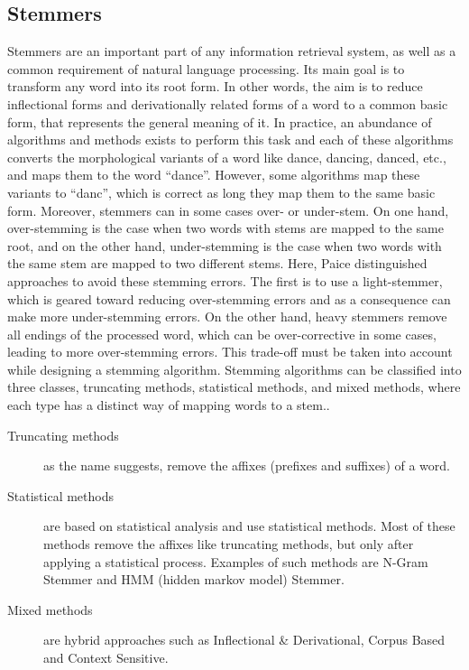		\subsection{Stemmers}\label{subsec:stemmer}
		Stemmers are an important part of any information retrieval system, as well as a common requirement of natural language processing. Its main goal is to transform any word into its root form. In other words, the aim is to reduce inflectional forms and derivationally related forms of a word to a common basic form, that represents the general meaning of it\cite{jivani2011comparative}.\newline
		In practice, an abundance of algorithms and methods exists to perform this task and each of these algorithms converts the morphological variants of a word like dance, dancing, danced, etc., and maps them to the word ``dance''. However, some algorithms map these variants to ``danc'', which is correct as long they map them to the same basic form.\cite{jivani2011comparative} Moreover, stemmers can in some cases over- or under-stem. On one hand, over-stemming is the case when two words with stems are mapped to the same root, and on the other hand, under-stemming is the case when two words with the same stem are mapped to two different stems. Here, Paice distinguished approaches to avoid these stemming errors. The first is to use a light-stemmer, which is geared toward reducing over-stemming errors and as a consequence can make more under-stemming errors. On the other hand, heavy stemmers remove all endings of the processed word, which can be over-corrective in some cases, leading to more over-stemming errors. This trade-off must be taken into account while designing a stemming algorithm.\cite{paice1994evaluation}\newline
		Stemming algorithms can be classified into three classes, truncating methods, statistical methods, and mixed methods, where each type has a distinct way of mapping words to a stem.\cite{jivani2011comparative}.
		\begin{description}
			\item[Truncating methods] as the name suggests, remove the affixes (prefixes and suffixes) of a word.
			\item[Statistical methods] are based on statistical analysis and use statistical methods. Most of these methods remove the affixes like truncating methods, but only after applying a statistical process. Examples of such methods are N-Gram Stemmer and HMM (hidden markov model) Stemmer.
			\item[Mixed methods] are hybrid approaches such as Inflectional \& Derivational, Corpus Based and Context Sensitive.
		\end{description}
